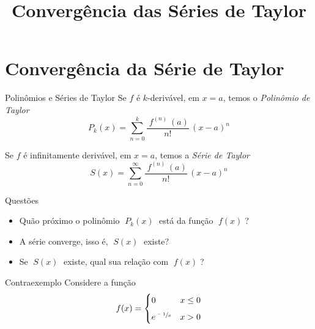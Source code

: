 
\usepackage{integracao_e_series}

\title{Convergência das Séries de Taylor}



\addtitle

\section{Convergência da Série de Taylor}

\begin{frame}{Polinômios e Séries de Taylor}
  Se $f$ é $k$-derivável, em \(x=a\), temos o \emph{Polinômio de Taylor}
  \[
    P_k(x) = \sum_{n=0}^k \frac{\;f^{(n)\;}(a)}{n!}\,(x-a)^n
  \]

  \pause
  \vspace{\baselineskip}
  Se $f$ é infinitamente derivável, em \(x=a\), temos a \emph{Série de Taylor}
  \[
    S(x) = \sum_{n=0}^\infty \frac{\;f^{(n)\;}(a)}{n!}\,(x-a)^n
  \]
\end{frame}

\begin{frame}{Questões}
  \begin{itemize}[<+->]
    \item Quão próximo o polinômio $\;P_k(x)\;$ está da função $\;f(x)\;$?
    \vspace{\baselineskip}
    \item A série converge, isso é, $\;S(x)\;$ existe?
    \vspace{\baselineskip}
    \item Se $\;S(x)\;$ existe, qual sua relação com $\;f(x)\;$?
  \end{itemize}
\end{frame}

\begin{frame}{Contraexemplo}
  Considere a função
  \[
    f(x) = \begin{cases}
      0                 & x \leq 0 \\[2mm]
      e^{\sfrac{-1}{x}} & x > 0
    \end{cases}
  \]
\end{frame}

